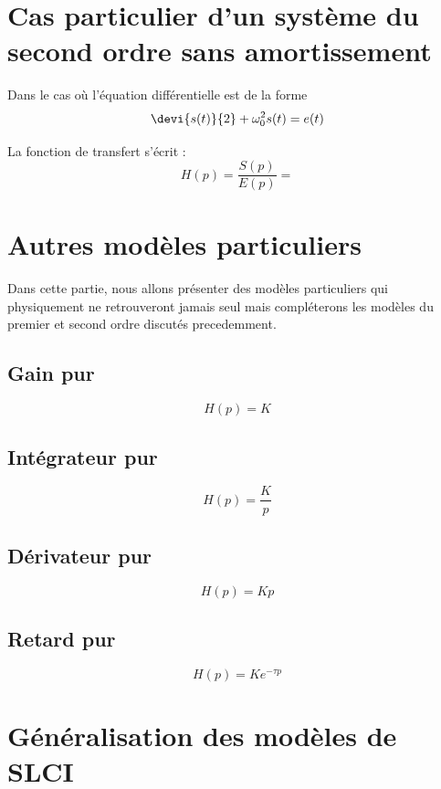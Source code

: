 \section{Cas particulier d'un système du second ordre sans amortissement}

Dans le cas où l'équation différentielle est de la forme 
$$
\devi{s(t)}{2}+\omega_0^2 s(t)=e(t)
$$

La fonction de transfert s'écrit :
$$
H(p)=\dfrac{S(p)}{E(p)}=
$$

\section{Autres modèles particuliers}

Dans cette partie, nous allons présenter des modèles particuliers qui physiquement ne retrouveront
jamais seul mais compléterons les modèles du premier et second ordre discutés precedemment.

\subsection{Gain pur}
$$
H(p)=K
$$
\subsection{Intégrateur pur}
$$
H(p)=\dfrac{K}{p}
$$
\subsection{Dérivateur pur}
$$
H(p)=Kp
$$
\subsection{Retard pur}
$$
H(p)=Ke^{-\tau p}
$$

\section{Généralisation des modèles de SLCI}

